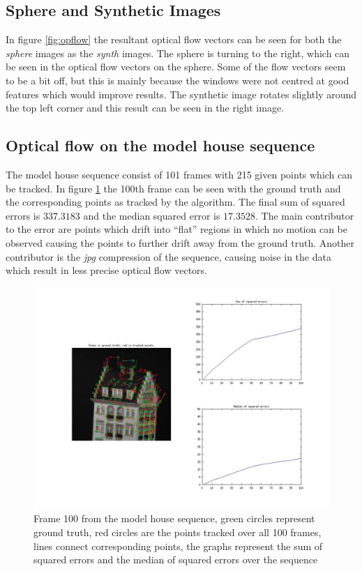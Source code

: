 \documentclass[a4paper,10pt]{article}
\begin{document}
\subsection{Sphere and Synthetic Images}
In figure \ref{fig:opflow} the resultant optical flow vectors can be seen for both the \emph{sphere} images as the \emph{synth} images. The sphere is turning to the right, which can be seen in the optical flow vectors on the sphere. Some of the flow vectors seem to be a bit off, but this is mainly because the windows were not centred at good features which would improve results. The synthetic image rotates slightly around the top left corner and this result can be seen in the right image.



\subsection{Optical flow on the model house sequence}
The model house sequence consist of 101 frames with 215 given points which can be tracked. In figure \ref{fig:modelhouse} the 100th frame can be seen with the ground truth and the corresponding points as tracked by the algorithm. The final sum of squared errors is $337.3183$ and the median squared error is $17.3528$. The main contributor to the error are points which drift into ``flat'' regions in which no motion can be observed causing the points to further drift away from the ground truth. Another contributor is the \emph{jpg} compression of the sequence, causing noise in the data which result in less precise optical flow vectors.

\begin{figure}[h!tb]
\includegraphics[width=1\textwidth]{frame00000100}
\caption{Frame 100 from the model house sequence, green circles represent ground truth, red circles are the points tracked over all 100 frames, lines connect corresponding points, the graphs represent the sum of squared errors and the median of squared errors over the sequence }
\label{fig:modelhouse}
\end{figure}
\end{document}
